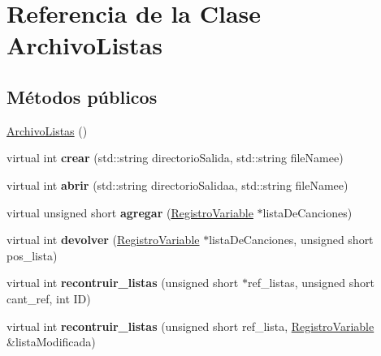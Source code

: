 \hypertarget{class_archivo_listas}{\section{\-Referencia de la \-Clase \-Archivo\-Listas}
\label{class_archivo_listas}
}
\subsection*{\-Métodos públicos}
\begin{DoxyCompactItemize}
\item 
\hyperlink{class_archivo_listas_a3275f7d94229dea7ac27a7bd8d479387}{\-Archivo\-Listas} ()
\item 
\hypertarget{class_archivo_listas_aee422fbfb2141c2a9a79c3df2eed2f57}{virtual int {\bfseries crear} (std\-::string directorio\-Salida, std\-::string file\-Namee)}\label{class_archivo_listas_aee422fbfb2141c2a9a79c3df2eed2f57}

\item 
\hypertarget{class_archivo_listas_aff71ac2d5f411525dcee7d5c7687cac4}{virtual int {\bfseries abrir} (std\-::string directorio\-Salidaa, std\-::string file\-Namee)}\label{class_archivo_listas_aff71ac2d5f411525dcee7d5c7687cac4}

\item 
\hypertarget{class_archivo_listas_ab337f0c79b15e07d33cc78f37f50bc95}{virtual unsigned short {\bfseries agregar} (\hyperlink{class_registro_variable}{\-Registro\-Variable} $\ast$lista\-De\-Canciones)}\label{class_archivo_listas_ab337f0c79b15e07d33cc78f37f50bc95}

\item 
\hypertarget{class_archivo_listas_a6e5b1656eeee0a30bc77c4df029e0c82}{virtual int {\bfseries devolver} (\hyperlink{class_registro_variable}{\-Registro\-Variable} $\ast$lista\-De\-Canciones, unsigned short pos\-\_\-lista)}\label{class_archivo_listas_a6e5b1656eeee0a30bc77c4df029e0c82}

\item 
\hypertarget{class_archivo_listas_ae2b9ecd5c59f8580fbee50cc2f8015ce}{virtual int {\bfseries recontruir\-\_\-listas} (unsigned short $\ast$ref\-\_\-listas, unsigned short cant\-\_\-ref, int \-I\-D)}\label{class_archivo_listas_ae2b9ecd5c59f8580fbee50cc2f8015ce}

\item 
\hypertarget{class_archivo_listas_a023deac7ac9c7c25aa260c4af75ee2cc}{virtual int {\bfseries recontruir\-\_\-listas} (unsigned short ref\-\_\-lista, \hyperlink{class_registro_variable}{\-Registro\-Variable} \&lista\-Modificada)}\label{class_archivo_listas_a023deac7ac9c7c25aa260c4af75ee2cc}


\end{DoxyCompactItemize}
